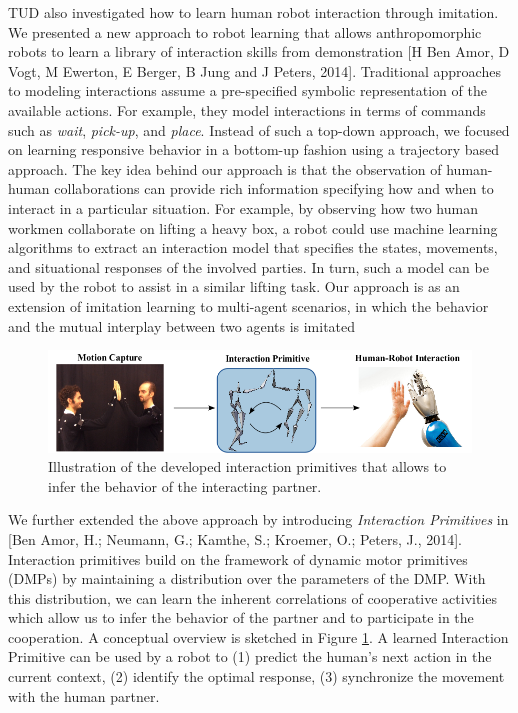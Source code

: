 \documentclass[12pt,a4paper,twoside]{article}
\begin{document}
TUD also investigated how to learn human robot interaction through imitation. We presented a new approach to robot learning that allows anthropomorphic robots to learn a library of interaction skills from demonstration [H Ben Amor, D Vogt, M Ewerton, E Berger, B Jung and J Peters, 2014]. Traditional approaches to modeling interactions assume a pre-specified symbolic representation of the available actions. For example, they model interactions
in terms of commands such as \emph{wait}, \emph{pick-up}, and \emph{place}. Instead of such a top-down approach, we focused on learning responsive behavior in a bottom-up fashion using a trajectory based approach. The key idea behind our approach is that the observation of human-human collaborations can provide rich information specifying how and when to interact
in a particular situation. For example, by observing how two human workmen collaborate on lifting a heavy box, a robot could use machine learning algorithms to extract an
interaction model that specifies the states, movements, and situational responses of the involved parties. In turn, such a model can be used by the robot to assist in a similar lifting task. Our approach is as an extension of imitation learning to multi-agent scenarios, in which the behavior and the mutual interplay between two agents is imitated

\begin{figure}[!ht]
\centering
\includegraphics[width=\textwidth]{./images/newoverview.png}
 \caption{Illustration of the developed interaction primitives that allows to infer the behavior of the interacting partner.
}
\label{fig:interaction_primitives}
\end{figure}

We further extended the above approach by introducing \emph{Interaction Primitives} in [Ben Amor, H.; Neumann, G.; Kamthe, S.; Kroemer, O.; Peters, J., 2014]. Interaction primitives build on the framework of dynamic motor primitives (DMPs) by maintaining a distribution over the parameters of the DMP. With this distribution, we can learn the inherent correlations of cooperative activities which allow us to infer the behavior of the partner and to participate in the cooperation. A conceptual overview is sketched in Figure \ref{fig:interaction_primitives}. A learned Interaction Primitive can be used by a robot to (1) predict the human's next action in the current context, (2) identify the optimal response, (3) synchronize the movement with the human partner.
\end{document}
